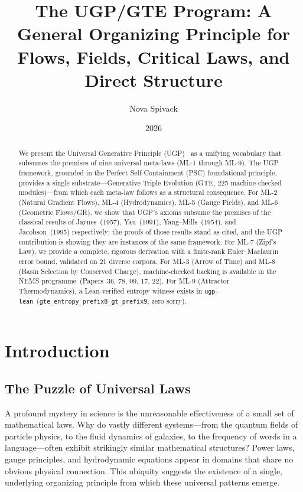 \documentclass[11pt]{article}
\title{\bfseries The UGP/GTE Program: A General Organizing Principle for Flows, Fields, Critical Laws, and Direct Structure}
\author[1]{Nova Spivack}
\date{2026}
\begin{document}
\maketitle
\NovaZenodoAfterTitle

\begin{abstract}
We present the Universal Generative Principle (UGP)~\cite{SpivackUGPFormalization,ugp-lean} as a unifying vocabulary that subsumes the premises of nine universal meta-laws (ML-1 through ML-9). The UGP framework, grounded in the Perfect Self-Containment (PSC) foundational principle, provides a single substrate—Generative Triple Evolution (GTE, 225 machine-checked modules)—from which each meta-law follows as a structural consequence. For ML-2 (Natural Gradient Flows), ML-4 (Hydrodynamics), ML-5 (Gauge Fields), and ML-6 (Geometric Flows/GR), we show that UGP's axioms subsume the premises of the classical results of Jaynes~(1957), Yau~(1991), Yang--Mills~(1954), and Jacobson~(1995) respectively; the proofs of those results stand as cited, and the UGP contribution is showing they are instances of the same framework. For ML-7 (Zipf's Law), we provide a complete, rigorous derivation with a finite-rank Euler--Maclaurin error bound, validated on 21 diverse corpora. For ML-3 (Arrow of Time) and ML-8 (Basin Selection by Conserved Charge), machine-checked backing is available in the NEMS programme~(Papers~36, 78, 09, 17, 22). For ML-9 (Attractor Thermodynamics), a Lean-verified entropy witness exists in \texttt{ugp-lean}~(\texttt{gte\_entropy\_prefix8\_gt\_prefix9}, zero sorry).
\end{abstract}

\tableofcontents

\section{Introduction}

\subsection{The Puzzle of Universal Laws}
A profound mystery in science is the unreasonable effectiveness of a small set of mathematical laws. Why do vastly different systems—from the quantum fields of particle physics, to the fluid dynamics of galaxies, to the frequency of words in a language—often exhibit strikingly similar mathematical structures? Power laws, gauge principles, and hydrodynamic equations appear in domains that share no obvious physical connection. This ubiquity suggests the existence of a single, underlying organizing principle from which these universal patterns emerge.
\end{document}
